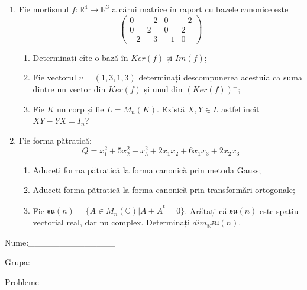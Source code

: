 \documentclass{article}
\begin{document}
\begin{enumerate}
 \item Fie morfismul $f:\mathbb{R}^4 \to \mathbb{R}^3$ a cărui matrice în raport cu bazele canonice este
$$\begin{pmatrix}
0&-2&0&-2\\
0&2&0&2\\
-2&-3&-1&0
\end{pmatrix}$$

\begin{enumerate}
\item Determinați cîte o bază în $Ker(f)$ și $Im(f)$;
\item Fie vectorul $v=(1,3,1,3)$ determinați descompunerea acestuia ca suma dintre un vector din $Ker(f)$ și unul din $(Ker(f))^\perp$;
\item Fie $K$ un corp și fie $L=M_n(K)$. Există $X,Y \in L$ astfel încît $XY-YX=I_n$?  
\end{enumerate}
\item Fie forma pătratică:
$$Q= x_1^2+5x_2^2+x_3^2+2x_1x_2+6x_1x_3+2x_2x_3$$

\begin{enumerate}
\item Aduceți forma pătratică la forma canonică prin metoda Gauss;
\item Aduceți forma pătratică la forma canonică prin transformări ortogonale;
\item Fie $\mathfrak{su}(n)=\{ A \in M_n(\mathbb{C}) | A+\bar{A}^t=0\}$. Arătați că $\mathfrak{su}(n)$ este spațiu vectorial real, dar nu complex.
Determinați $dim_{\mathbb{R}}\mathfrak{su}(n)$.
\end{enumerate}
\end{enumerate}
\newpage
\begin{flushright}
Nume:\_\_\_\_\_\_\_\_\_\_\_\_\_\_
 
 
Grupa:\_\_\_\_\_\_\_\_\_\_\_\_\_\_
\end{flushright}
\begin{center}
\vspace{2cm}
{\Large Probleme}
\vspace{2cm}
\end{center}
\end{document}
